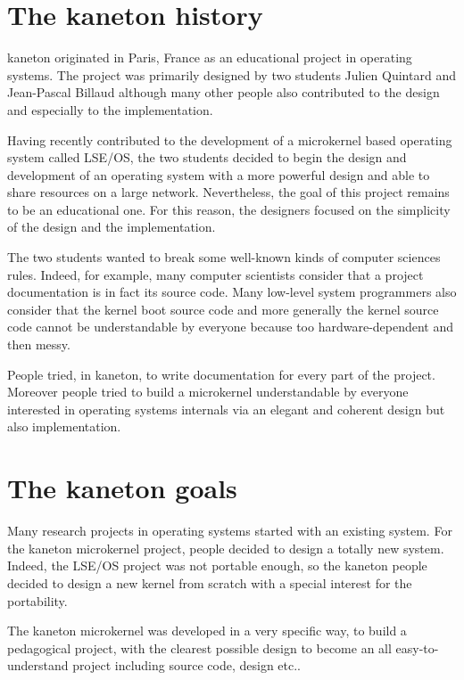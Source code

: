 \begin{multicols}{2}

%
%

\section{The kaneton history}

kaneton originated in Paris, France as an educational project in operating
systems. The project was primarily designed by two students Julien Quintard
and Jean-Pascal Billaud although many other people also contributed to
the design and especially to the implementation.

Having recently contributed to the development of a microkernel based
operating system called LSE/OS, the two students decided to begin the
design and development of an operating system with a more powerful design
and able to share resources on a large network. Nevertheless, the goal of
this project remains to be an educational one. For this reason, the
designers focused on the simplicity of the design and the implementation.

The two students wanted to break some well-known kinds of computer sciences
rules. Indeed, for example, many computer scientists consider that a
project documentation is in fact its source code. Many low-level system
programmers also consider that the kernel boot source code and more
generally the kernel source code cannot be understandable by everyone
because too hardware-dependent and then messy.

People tried, in kaneton, to write documentation for every part of the
project. Moreover people tried to build a microkernel understandable
by everyone interested in operating systems internals via an elegant
and coherent design but also implementation.

%
%

\section{The kaneton goals}

Many research projects in operating systems started with an existing system.
For the kaneton microkernel project, people decided to design a totally
new system. Indeed, the LSE/OS project was not portable enough, so the
kaneton people decided to design a new kernel from scratch with a
special interest for the portability.

The kaneton microkernel was developed in a very specific way, to build
a pedagogical project, with the clearest possible design to become an
all easy-to-understand project including source code, design etc..


\end{multicols}
